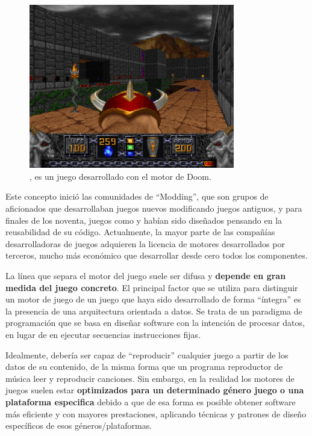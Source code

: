 \begin{figure}[h]
    \centering
    \includegraphics[width=0.8\textwidth]{images/estadodelarte/motores/heretic}
    \caption{, es un juego desarrollado con el motor de Doom.}
    \label{heretic}
\end{figure}

Este concepto inició las comunidades de ``Modding'', que son grupos de aficionados que desarrollaban juegos nuevos modificando juegos antiguos, y para finales de los noventa, juegos como  y  habían sido diseñados pensando en la reusabilidad de su código. Actualmente, la mayor parte de las compañías desarrolladoras de juegos adquieren la licencia de motores desarrollados por terceros, mucho más económico que desarrollar desde cero todos los componentes.

La línea que separa el motor del juego suele ser difusa y \textbf{depende en gran medida del juego concreto}. El principal factor que se utiliza para distinguir un motor de juego de un juego que haya sido desarrollado de forma ``íntegra'' es la presencia de una arquitectura orientada a datos. Se trata de un paradigma de programación que se basa en diseñar software con la intención de procesar datos, en lugar de en ejecutar secuencias instrucciones fijas.

Idealmente, debería ser capaz de ``reproducir'' cualquier juego a partir de los datos de su contenido, de la misma forma que un programa reproductor de música leer y reproducir canciones. Sin embargo, en la realidad los motores de juegos suelen estar \textbf{optimizados para un determinado género juego o una plataforma especifica} debido a que de esa forma es posible obtener software más eficiente y con mayores prestaciones, aplicando técnicas y patrones de diseño específicos de esos géneros/plataformas.

